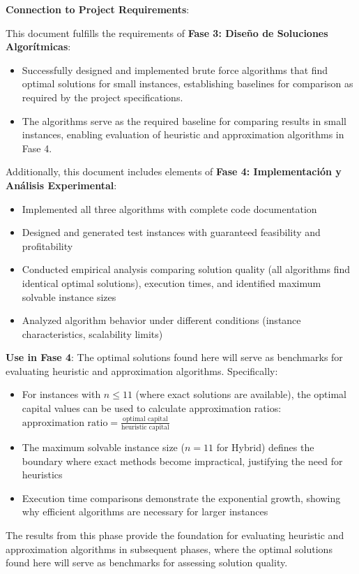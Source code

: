 \documentclass[12pt]{article}
\begin{document}
\textbf{Connection to Project Requirements}:

This document fulfills the requirements of \textbf{Fase 3: Diseño de Soluciones Algorítmicas}:
\begin{itemize}
    \item Successfully designed and implemented brute force algorithms that find optimal solutions for small instances, establishing baselines for comparison as required by the project specifications.
    \item The algorithms serve as the required baseline for comparing results in small instances, enabling evaluation of heuristic and approximation algorithms in Fase 4.
\end{itemize}

Additionally, this document includes elements of \textbf{Fase 4: Implementación y Análisis Experimental}:
\begin{itemize}
    \item Implemented all three algorithms with complete code documentation
    \item Designed and generated test instances with guaranteed feasibility and profitability
    \item Conducted empirical analysis comparing solution quality (all algorithms find identical optimal solutions), execution times, and identified maximum solvable instance sizes
    \item Analyzed algorithm behavior under different conditions (instance characteristics, scalability limits)
\end{itemize}

\textbf{Use in Fase 4}: The optimal solutions found here will serve as benchmarks for evaluating heuristic and approximation algorithms. Specifically:
\begin{itemize}
    \item For instances with $n \leq 11$ (where exact solutions are available), the optimal capital values can be used to calculate approximation ratios: $\text{approximation ratio} = \frac{\text{optimal capital}}{\text{heuristic capital}}$
    \item The maximum solvable instance size ($n=11$ for Hybrid) defines the boundary where exact methods become impractical, justifying the need for heuristics
    \item Execution time comparisons demonstrate the exponential growth, showing why efficient algorithms are necessary for larger instances
\end{itemize}

The results from this phase provide the foundation for evaluating heuristic and approximation algorithms in subsequent phases, where the optimal solutions found here will serve as benchmarks for assessing solution quality.



\end{document}

